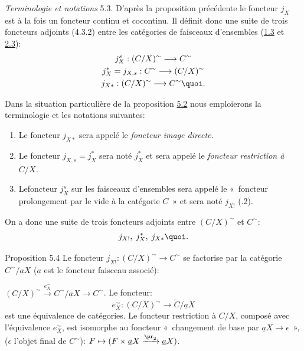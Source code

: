 \noindent \emph{Terminologie et notations} 5.3. D'après la
proposition précédente le foncteur $j_X$ est à la fois un
foncteur continu et cocontinu. Il définit donc une suite de
trois foncteurs adjoints (4.3.2) entre les catégories de
faisceaux d'ensembles (\hyperref[III.prop1.3]{1.3} et \hyperref[III.prop2.3]{2.3}):
\begin{gather*}
j^s_X:(C/X)^{\sim}\longrightarrow
C^{\sim}\\
j^{\ast}_X=j_{X,s}:C^{\sim}\longrightarrow
(C/X)^{\sim}\\
j_{X\ast}:(C/X)^{\sim}\longrightarrow C^{\sim}{\quoi}.
\end{gather*}

Dans la situation particulière de la proposition \hyperref[III.prop5.2]{5.2}
nous emploierons la terminologie et les notations suivantes:
\begin{enumerate}
\renewcommand{\labelenumi}{\theenumi)}
\item Le foncteur $j_{X\ast}$ sera appelé le \emph{foncteur image
directe.}

\item Le foncteur $j_{X,s}=j^{\ast}_X$ sera noté $j^{\ast}_X$ et
sera appelé le \emph{foncteur restriction à $C/X$.}

\item Le\pageoriginale foncteur $j^s_X$ sur les faisceaux d'ensembles
sera appelé le « foncteur prolongement par le vide à la
catégorie $C$ » et sera noté $j_{X!}$ (.2).
\end{enumerate}

On a donc une suite de trois foncteurs adjoints entre $(C/X)^{\sim}$
et $C^{\sim}$:
$$
j_{X!},\; j^{\ast}_X,\; j_{X\ast}{\quoi}.
$$

\begin{enonce*}{Proposition 5.4}
Le foncteur $j_{X!}:(C/X)^{\sim}\rightarrow C^{\sim}$ se factorise
par la catégorie $C^{\sim}/\underline{a}X$ ($\underline{a}$ est le
foncteur faisceau associé):

$(C/X)^{\sim}\xrightarrow{e^{\sim}_X} C^{\sim}/\underline{a}X\rightarrow
C^{\sim}$. Le foncteur:
$$
e^{\sim}_X:(C/X)^{\sim}\longrightarrow \widetilde{C}/\underline{a}X
$$
est une équivalence de catégories. Le foncteur restriction
à $C/X$, composé avec l'équivalence $e^{\sim}_X$, est
isomorphe au foncteur « changement de base par
$\underline{a}X\rightarrow \epsilon$ », ($\epsilon$ l'objet final de
$C^{\sim}$): $F\mapsto (F\times
\underline{a}X\xrightarrow{\pr_2}\underline{a}X)$.
\end{enonce*}

